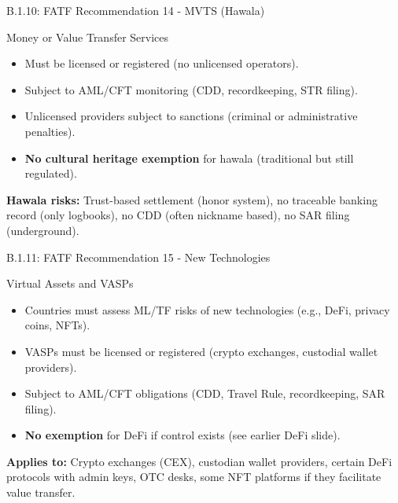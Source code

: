 \documentclass{beamer}
\begin{document}
	\begin{frame}{B.1.10: FATF Recommendation 14 - MVTS (Hawala)}
		\begin{block}{Money or Value Transfer Services}
			\begin{itemize}
				\item Must be licensed or registered (no unlicensed operators).
				\item Subject to AML/CFT monitoring (CDD, recordkeeping, STR filing).
				\item Unlicensed providers subject to sanctions (criminal or administrative penalties).
				\item \textbf{No cultural heritage exemption} for hawala (traditional but still regulated).
			\end{itemize}
		\end{block}
		\textbf{Hawala risks:} Trust-based settlement (honor system), no traceable banking record (only logbooks), no CDD (often nickname based), no SAR filing (underground).
	\end{frame}
	
	\begin{frame}{B.1.11: FATF Recommendation 15 - New Technologies}
		\begin{block}{Virtual Assets and VASPs}
			\begin{itemize}
				\item Countries must assess ML/TF risks of new technologies (e.g., DeFi, privacy coins, NFTs).
				\item VASPs must be licensed or registered (crypto exchanges, custodial wallet providers).
				\item Subject to AML/CFT obligations (CDD, Travel Rule, recordkeeping, SAR filing).
				\item \textbf{No exemption} for DeFi if control exists (see earlier DeFi slide).
			\end{itemize}
		\end{block}
		\textbf{Applies to:} Crypto exchanges (CEX), custodian wallet providers, certain DeFi protocols with admin keys, OTC desks, some NFT platforms if they facilitate value transfer.
	\end{frame}
	
\end{document}
